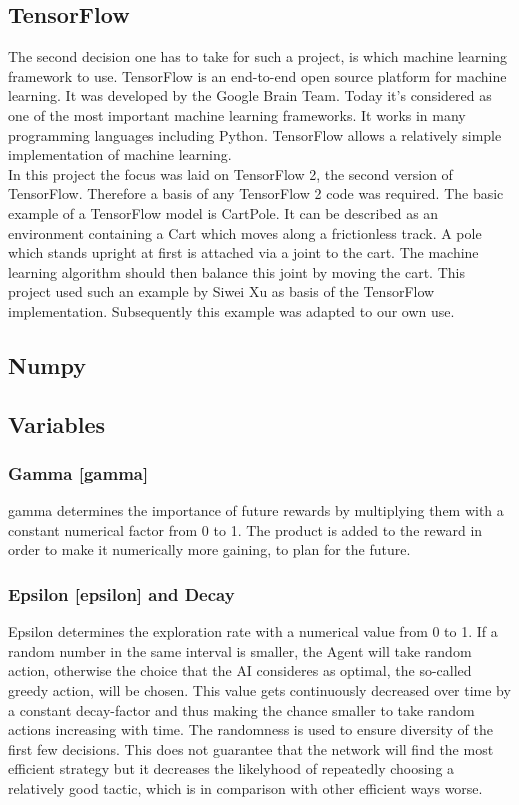 \documentclass[12pt]{article}
\def\epsilon{epsilon}%
\def\gamma{gamma}%
\def\({}%
\def\){}%
\begin{document}
\subsection{TensorFlow}
The second decision one has to take for such a project, is which \gls{machine learning} framework to use. TensorFlow is an end-to-end open source platform for \gls{machine learning}. It was developed by the Google Brain Team. Today it's considered as one of the most important \gls{machine learning} frameworks. It works in many programming languages including Python. TensorFlow allows a relatively simple implementation of \gls{machine learning}. \cite{Tensorflow}\cite{TensorFlowWikipedia}\\
In this project the focus was laid on TensorFlow 2, the second version of TensorFlow. Therefore a basis of any TensorFlow 2 code was required. The basic example of a TensorFlow model is \gls{CartPole}. It can be described as an \gls{environment} containing a Cart which moves along a frictionless track. A pole which stands upright at first is attached via a joint to the cart. The \gls{machine learning} algorithm should then balance this joint by moving the cart. This project used such an example by Siwei Xu as basis of the TensorFlow implementation. Subsequently this example was adapted to our own use.
\cite{ourDqnModelBasis}
\subsection{Numpy}

\subsection{Variables} \label{sec:variables}
\subsubsection{Gamma [\(\gamma\)]}\label{sssec:gamma}
\Gls{gamma} determines the importance of future \glspl{reward} by multiplying them with a constant numerical factor from 0 to 1. The product is added to the \gls{reward} in order to make it numerically more gaining, to plan for the future.

\subsubsection{Epsilon [\(\epsilon\)] and Decay}
Epsilon determines the \gls{exploration rate} with a numerical value from 0 to 1. If a random number in the same interval is smaller, the Agent will take random action, otherwise the choice that the \gls{AI} consideres as optimal, the so-called \gls{greedy action}, will be chosen. This value gets continuously decreased over time by a constant decay-factor and thus making the chance smaller to take random actions increasing with time. The randomness is used to ensure diversity of the first few decisions. This does not guarantee that the network will find the most efficient strategy but it decreases the likelyhood of repeatedly choosing a relatively good tactic, which is in comparison with other efficient ways worse.
\end{document}
